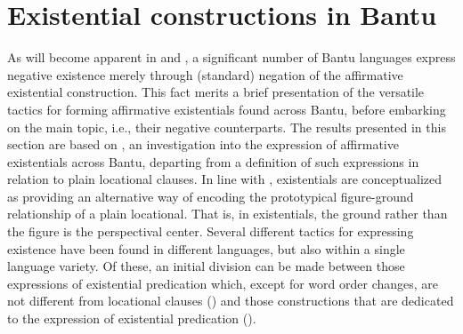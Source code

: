 \documentclass[output=paper]{langscibook}
\begin{document}
\section{Existential constructions in Bantu}\label{sec:1:3} 
As will become apparent in  and
, a significant number of Bantu languages express
negative existence merely through (standard) negation of the affirmative
existential construction. This fact merits a brief presentation of the
versatile tactics for forming affirmative existentials found across Bantu,
before embarking on the main topic, i.e., their negative counterparts. The
results presented in this section are based on \citet{BernanderDevos2018},
an investigation into the expression of affirmative existentials across
Bantu, departing from a definition of such expressions in relation to plain
locational clauses. In line with \citet{Creissels2014,Creissels2015},
existentials are conceptualized as providing an alternative way of encoding
the prototypical figure-ground relationship of a plain locational. That is,
in existentials, the ground rather than the figure is the perspectival
center. Several different tactics for expressing existence have been found
in different languages, but also within a single language variety. Of
these, an initial division can be made between those expressions of
existential predication which, except for word order changes, are not
different from locational clauses () and those
constructions that are dedicated to the expression of existential
predication ().
\end{document}
